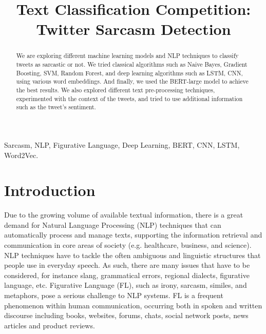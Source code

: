\documentclass[conference]{IEEEtran}
\begin{document}
\title{Text Classification Competition: Twitter Sarcasm Detection}

\author{
\and
\and
	}

\maketitle

\begin{abstract}
We are exploring different machine learning models and NLP techniques to classify tweets as sarcastic or not. We tried classical algorithms such as Naive Bayes, Gradient Boosting, SVM, Random Forest, and deep learning algorithms such as LSTM, CNN, using various word embeddings. And finally, we used the BERT-large model to achieve the best results. We also explored different text pre-processing techniques, experimented with the context of the tweets, and tried to use additional information such as the tweet's sentiment.
\end{abstract}

\begin{IEEEkeywords}
Sarcasm, NLP, Figurative Language, Deep Learning, BERT, CNN, LSTM, Word2Vec.
\end{IEEEkeywords}

\section{Introduction}

Due to the growing volume of available textual information, there is a great demand for Natural Language Processing (NLP) techniques that can automatically process and manage texts, supporting the information retrieval and communication in core areas of society (e.g. healthcare, business, and science). NLP techniques have to tackle the often ambiguous and linguistic structures that people use in everyday speech. As such, there are many issues that have to be considered, for instance slang, grammatical errors, regional dialects, figurative language, etc. Figurative Language (FL), such as irony, sarcasm, similes, and metaphors, pose a serious challenge to NLP systems. FL is a frequent phenomenon within human communication, occurring both in spoken and written discourse including books, websites, forums, chats, social network posts, news articles and product reviews. \cite{b1}
\end{document}
